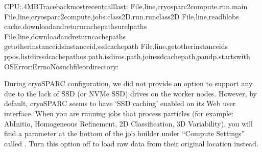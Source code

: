 \documentclass[a4paper,11pt,english]{sphinxmanual}
\begin{document}
\begin{sphinxVerbatim}[commandchars=\\\{\}]
\PYG{o}{[}CPU:.4MB\PYG{o}{]}Tracebackmostrecentcalllast:
File,line,cryosparc2\PYGZus{}compute.run.main
File,line,cryosparc2\PYGZus{}compute.jobs.class2D.run.run\PYGZus{}class\PYGZus{}2D
File,line,read\PYGZus{}blobs
cache.download\PYGZus{}and\PYGZus{}return\PYGZus{}cache\PYGZus{}pathsu\PYGZus{}rel\PYGZus{}paths
File,line,download\PYGZus{}and\PYGZus{}return\PYGZus{}cache\PYGZus{}paths
get\PYGZus{}other\PYGZus{}instance\PYGZus{}idsinstance\PYGZus{}id,ssd\PYGZus{}cache\PYGZus{}path
File,line,get\PYGZus{}other\PYGZus{}instance\PYGZus{}ids
\PYG{o}{[}ppos.listdirssd\PYGZus{}cache\PYGZus{}pathos.path.isdiros.path.joinssd\PYGZus{}cache\PYGZus{}path,pandp.startswith\PYG{o}{]}
OSError:\PYG{o}{[}Errno\PYG{o}{]}Nosuchfileordirectory:
\end{sphinxVerbatim}

\sphinxAtStartPar
During cryoSPARC configuration, we did not provide an option to support any  due to the lack of SSD (or NVMe SSD) drives on the worker nodes.
However, by default, cryoSPARC seems to have ‘SSD caching’ enabled on its Web user interface. When you are running jobs that process particles (for example: Ab\sphinxhyphen{}Initio, Homogeneous Refinement, 2D Classification, 3D Variability),
you will find a parameter at the bottom of the job builder under “Compute Settings” called .
Turn this option off to load raw data from their original location instead.
\end{document}
